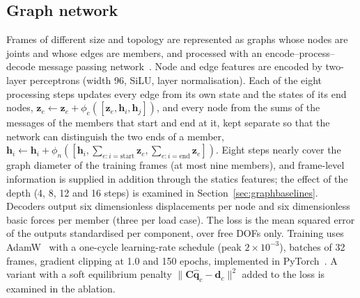 \subsection{Graph network}\label{sec:gnn}
Frames of different size and topology are represented as graphs whose nodes are joints and whose edges are members, and processed with an encode--process--decode message passing network~\cite{battaglia2018relational,gilmer2017mpnn,sanchez2020learning,pfaff2021meshgraphnets}. Node and edge features are encoded by two-layer perceptrons (width 96, SiLU, layer normalisation). Each of the eight processing steps updates every edge from its own state and the states of its end nodes, $\mathbf{z}_e \leftarrow \mathbf{z}_e + \phi_e([\mathbf{z}_e,\mathbf{h}_i,\mathbf{h}_j])$, and every node from the sums of the messages of the members that start and end at it, kept separate so that the network can distinguish the two ends of a member, $\mathbf{h}_i \leftarrow \mathbf{h}_i + \phi_n([\mathbf{h}_i,\sum_{e:i=\mathrm{start}}\mathbf{z}_e,\sum_{e:i=\mathrm{end}}\mathbf{z}_e])$. Eight steps nearly cover the graph diameter of the training frames (at most nine members), and frame-level information is supplied in addition through the statics features; the effect of the depth (4, 8, 12 and 16 steps) is examined in Section~\ref{sec:graphbaselines}. Decoders output six dimensionless displacements per node and six dimensionless basic forces per member (three per load case). The loss is the mean squared error of the outputs standardised per component, over free DOFs only. Training uses AdamW~\cite{loshchilov2019adamw} with a one-cycle learning-rate schedule (peak $2\times10^{-3}$), batches of 32 frames, gradient clipping at 1.0 and 150 epochs, implemented in PyTorch~\cite{paszke2019pytorch}. A variant with a soft equilibrium penalty $\|\mathbf{C}\hat{\mathbf{q}}_c-\mathbf{d}_c\|^2$ added to the loss is examined in the ablation.


